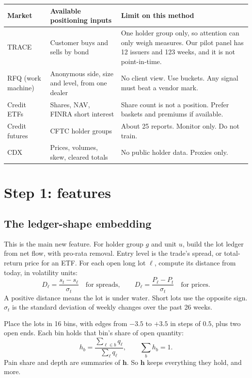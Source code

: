 \documentclass[11pt]{article}
\begin{document}
\begin{center}\small
\begin{tabularx}{\linewidth}{@{}lLL@{}}
\toprule
Market & Available positioning inputs & Limit on this method \\
\midrule
TRACE & Customer buys and sells by bond & One holder group only, so attention can only weigh measures. Our pilot panel has 12 issuers and 123 weeks, and it is not point-in-time. \\
RFQ (work machine) & Anonymous side, size and level, from one dealer & No client view. Use buckets. Any signal must beat a vendor mark. \\
Credit ETFs & Shares, NAV, FINRA short interest & Share count is not a position. Prefer baskets and premiums if available. \\
Credit futures & CFTC holder groups & About 25 reports. Monitor only. Do not train. \\
CDX & Prices, volumes, skew, cleared totals & No public holder data. Proxies only. \\
\bottomrule
\end{tabularx}
\end{center}

\section{Step 1: features}
\subsection{The ledger-shape embedding}
This is the main new feature. For holder group $g$ and unit $u$, build the lot ledger from net flow, with pro-rata removal. Entry level is the trade's spread, or total-return price for an ETF. For each open long lot $\ell$, compute its distance from today, in volatility units:
\[
D_\ell = \frac{s_t - s_\ell}{\sigma_t} \quad\text{for spreads}, \qquad
D_\ell = \frac{P_\ell - P_t}{\sigma_t} \quad\text{for prices}.
\]
A positive distance means the lot is under water. Short lots use the opposite sign. $\sigma_t$ is the standard deviation of weekly changes over the past 26 weeks.

Place the lots in 16 bins, with edges from $-3.5$ to $+3.5$ in steps of $0.5$, plus two open ends. Each bin holds that bin's share of open quantity:
\[
h_{b} = \frac{\sum_{\ell \in b} q_\ell}{\sum_{\ell} q_\ell}, \qquad \sum_b h_b = 1 .
\]
Pain share and depth are summaries of $\mathbf{h}$. So $\mathbf{h}$ keeps everything they hold, and more.
\end{document}
